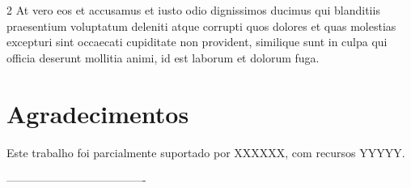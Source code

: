 \documentclass[a0,portrait]{a0poster}
\begin{document}
\begin{mdframed}[style=MyFrame]
\begin{multicols}{2}
At vero eos et accusamus et iusto odio dignissimos ducimus qui blanditiis praesentium voluptatum deleniti atque corrupti quos dolores et quas molestias excepturi sint occaecati cupiditate non provident, similique sunt in culpa qui officia deserunt mollitia animi, id est laborum et dolorum fuga.

\section*{Agradecimentos}
%
Este trabalho foi parcialmente suportado por XXXXXX, com recursos  YYYYY.

%
%

-------------------------------------
\end{multicols}
\begin{center}
\color{SteelBlue}{SBrT 2023 - São José dos Campos, SP - 08 a 11 de Outubro de 2023}
\end{center}
\end{mdframed}
\end{document}
